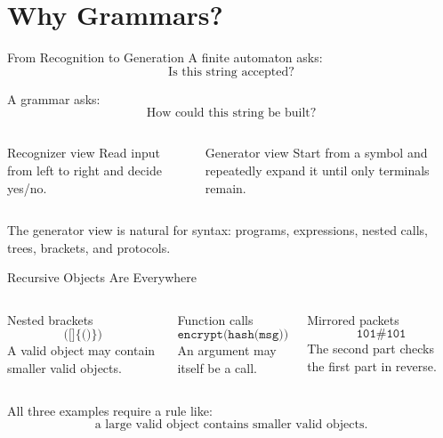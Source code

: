 \documentclass[aspectratio=169,10pt]{beamer}
\newcommand{\code}[1]{\texttt{#1}}
\begin{document}
\section{Why Grammars?}

\begin{frame}{From Recognition to Generation}
\small
A finite automaton asks:
\[
\boxed{\text{Is this string accepted?}}
\]

A grammar asks:
\[
\boxed{\text{How could this string be built?}}
\]

\vspace{0.5em}
\begin{columns}[T,onlytextwidth]
\begin{block}{Recognizer view}
Read input from left to right and decide yes/no.
\end{block}

\begin{exampleblock}{Generator view}
Start from a symbol and repeatedly expand it until only terminals remain.
\end{exampleblock}
\end{columns}

\vspace{0.8em}
The generator view is natural for syntax: programs, expressions, nested calls, trees, brackets, and protocols.
\end{frame}

\begin{frame}{Recursive Objects Are Everywhere}
\small
\begin{columns}[T,onlytextwidth]
\begin{block}{Nested brackets}
\[
\code{([]\{()\})}
\]
A valid object may contain smaller valid objects.
\end{block}

\begin{exampleblock}{Function calls}
\[
\code{encrypt(hash(msg))}
\]
An argument may itself be a call.
\end{exampleblock}

\begin{alertblock}{Mirrored packets}
\[
\code{101\#101}
\]
The second part checks the first part in reverse.
\end{alertblock}
\end{columns}

\vspace{1em}
All three examples require a rule like:
\[
\boxed{\text{a large valid object contains smaller valid objects}.}
\]
\end{frame}
\end{document}
